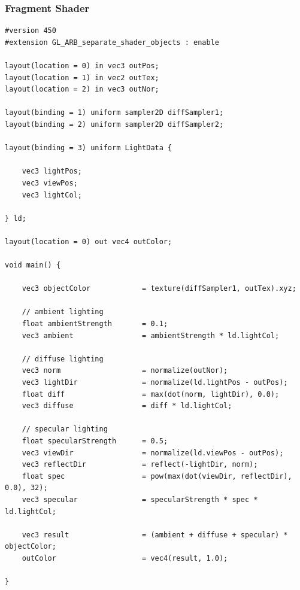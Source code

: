 \documentclass[titlepage, 11pt, a4paper, ngerman]{article}
\begin{document}
\subsubsection{Fragment Shader}
\begin{verbatim}
#version 450
#extension GL_ARB_separate_shader_objects : enable

layout(location = 0) in vec3 outPos;
layout(location = 1) in vec2 outTex;
layout(location = 2) in vec3 outNor;

layout(binding = 1) uniform sampler2D diffSampler1;
layout(binding = 2) uniform sampler2D diffSampler2;

layout(binding = 3) uniform LightData {

    vec3 lightPos;
    vec3 viewPos;
    vec3 lightCol;

} ld;

layout(location = 0) out vec4 outColor;

void main() {

    vec3 objectColor            = texture(diffSampler1, outTex).xyz;

    // ambient lighting
    float ambientStrength       = 0.1;
    vec3 ambient                = ambientStrength * ld.lightCol;

    // diffuse lighting
    vec3 norm                   = normalize(outNor);
    vec3 lightDir               = normalize(ld.lightPos - outPos);
    float diff                  = max(dot(norm, lightDir), 0.0);
    vec3 diffuse                = diff * ld.lightCol;

    // specular lighting
    float specularStrength      = 0.5;
    vec3 viewDir                = normalize(ld.viewPos - outPos);
    vec3 reflectDir             = reflect(-lightDir, norm);
    float spec                  = pow(max(dot(viewDir, reflectDir), 0.0), 32);
    vec3 specular               = specularStrength * spec * ld.lightCol;

    vec3 result                 = (ambient + diffuse + specular) * objectColor;
    outColor                    = vec4(result, 1.0);

}
\end{verbatim}

\newpage
\end{document}
